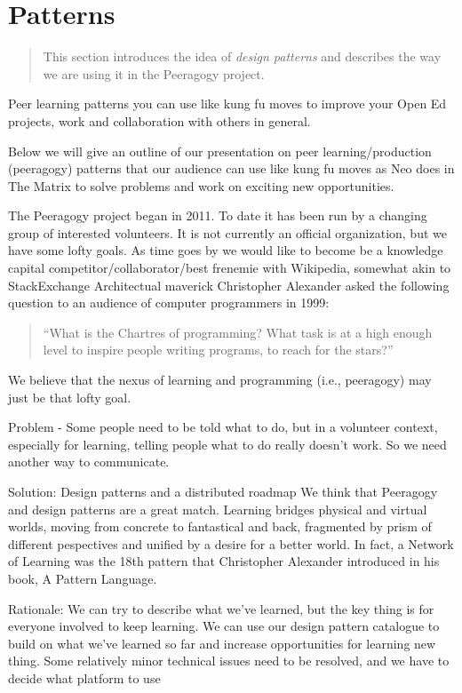 \section{Patterns}
\begin{quote}
This section introduces the idea of \emph{design patterns} and describes the way we are using it in the Peeragogy project.
\end{quote}

Peer learning patterns you can use like kung fu moves to improve your Open Ed projects, work and collaboration with others in general.

Below we will give an outline of our presentation on peer learning/production (peeragogy) patterns that our audience can use like kung fu moves as Neo does in The Matrix to solve problems and work on exciting new opportunities.

The Peeragogy project began in 2011.  To date it has been run by a changing group of interested volunteers.   It is not currently an official organization, but we have some lofty goals.  As time goes by we would like to become be a knowledge capital competitor/collaborator/best frenemie with Wikipedia, somewhat akin to StackExchange
Architectual maverick Christopher Alexander asked the following question to an audience of computer programmers in 1999: 
\begin{quote}
``What is the Chartres of programming? What task is at a high enough level to inspire people writing programs, to reach for the stars?''
\end{quote}
We believe that the nexus of learning and programming (i.e., peeragogy) may just be that lofty goal.

Problem - Some people need to be told what to do, but in a volunteer context, especially for learning, telling people what to do really doesn't work.  So we need another way to communicate.

Solution: Design patterns and a distributed roadmap
We think that Peeragogy and design patterns are a great match.  Learning bridges physical and virtual worlds, moving from concrete to fantastical and back, fragmented by prism of different pespectives and unified by a desire for a better world. In fact, a Network of Learning was the 18th pattern that Christopher Alexander introduced in his book, A Pattern Language.

Rationale:
We can try to describe what we've learned, but the key thing is for everyone involved to keep learning. We can use our design pattern catalogue to build on what we've learned so far and increase opportunities for learning new thing.
Some relatively minor technical issues need to be resolved, and we
have to decide what platform to use

